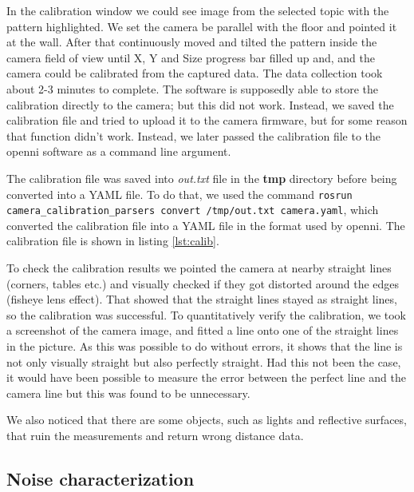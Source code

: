 \documentclass[11pt]{article}
\begin{document}
In the calibration window we could see image from the selected topic with the
pattern highlighted. We set the camera be parallel with the floor and pointed it
at the wall. After that continuously moved and tilted the pattern inside the
camera field of view until X, Y and Size progress bar filled up and, and the
camera could be calibrated from the captured data. The data collection took
about 2-3 minutes to complete.  The software is supposedly able to store the
calibration directly to the camera; but this did not work. Instead, we saved the
calibration file and tried to upload it to the camera firmware, but for some
reason that function didn't work. Instead, we later passed the calibration file
to the openni software as a command line argument. \par
        
The calibration file was saved into \emph{out.txt} file in the \textbf{tmp}
directory before being converted into a YAML file. To do that, we used
the command \texttt{rosrun camera\_calibration\_parsers convert /tmp/out.txt camera.yaml},
which converted the calibration file into a YAML file in the format used by openni. The calibration file is shown in listing \vref{lst:calib}. \par
        
To check the calibration results we pointed the camera at nearby straight lines
(corners, tables etc.) and visually checked if they got distorted around the
edges (fisheye lens effect). That showed that the straight lines stayed as
straight lines, so the calibration was successful. To quantitatively verify the
calibration, we took a screenshot of the camera image, and fitted a line onto
one of the straight lines in the picture. As this was possible to do without errors, it shows
that the line is not only visually straight but also perfectly straight. Had
this not been the case, it would have been possible to measure the error
between the perfect line and the camera line but this was found to be
unnecessary. \par

We also noticed that there are some objects, such as lights and reflective 
surfaces, that ruin the measurements and return wrong distance 
data. \par
	


\subsection{Noise characterization}
\end{document}
